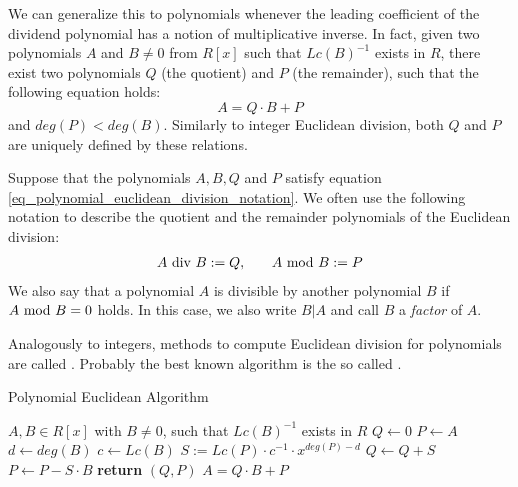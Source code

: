 We can generalize this to polynomials whenever the leading coefficient of the dividend polynomial has a notion of multiplicative inverse. In fact, given two polynomials $A$ and $B\neq 0$ from $R[x]$ such that $Lc(B)^{-1}$ exists in $R$, there exist two polynomials $Q$ (the quotient) and $P$ (the remainder), such that the following equation holds:
\begin{equation}
\label{eq_polynomial_euclidean_division_notation}
A = Q\cdot B + P
\end{equation}
and $deg(P) < deg(B)$. Similarly to integer Euclidean division, both $Q$ and $P$ are uniquely defined by these relations.
\begin{notation}
\label{notation_polynomial_euclidean_division_notation}
Suppose that the polynomials $ A, B, Q $ and $ P $ satisfy equation \ref{eq_polynomial_euclidean_division_notation}. We often use the following notation to describe the quotient and the remainder polynomials of the Euclidean division:
\begin{equation}
\label{def_polynomial_division_and_modulus}
\begin{array}{lcr}
A \text{ div } B: = Q, & & A \text{ mod } B: = P
\end{array}
\end{equation}
We also say that a polynomial $ A $ is divisible by another polynomial $ B $ if $ A \text{ mod } B = 0 $ holds. In this case, we also write $ B | A $ and call $B$ a \textit{factor} of $A$.
\end{notation}
Analogously to integers, methods to compute Euclidean division for polynomials are called . Probably the best known algorithm is the so called  .
\begin{algorithm}\caption{Polynomial Euclidean Algorithm}
\label{alg_polynom_euclid_alg}
\begin{algorithmic}[0]
\Require $A,B \in R[x]$ with $B\neq 0$, such that $Lc(B)^{-1}$ exists in $R$
\State $Q \gets 0$
\State $P \gets A$
\State $d \gets deg(B)$
\State $c \gets Lc(B)$
\State  $S := Lc(P)\cdot c^{-1}\cdot x^{deg(P)-d}$
\State $Q \gets Q + S$
\State $P \gets P - S\cdot B$
\EndWhile
\State \textbf{return} $(Q, P)$
\EndProcedure
\Ensure $ A=  Q \cdot B + P$
\end{algorithmic}
\end{algorithm}

